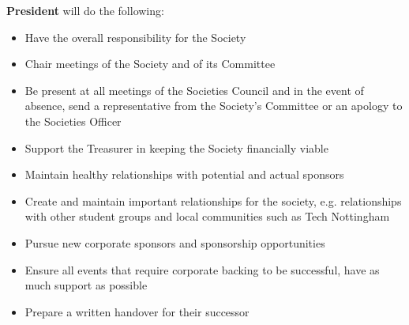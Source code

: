 \item \textbf{President} will do the following:
\begin{itemize}
  \item Have the overall responsibility for the Society
  \item Chair meetings of the Society and of its Committee
  \item Be present at all meetings of the Societies Council and in the event of absence, send a representative from the Society's Committee or an apology to the Societies Officer
  \item Support the Treasurer in keeping the Society financially viable
  \item Maintain healthy relationships with potential and actual sponsors
  \item Create and maintain important relationships for the society, e.g. relationships with other student groups and local communities such as Tech Nottingham
  \item Pursue new corporate sponsors and sponsorship opportunities
  \item Ensure all events that require corporate backing to be successful, have as much support as possible
  \item Prepare a written handover for their successor
\end{itemize}